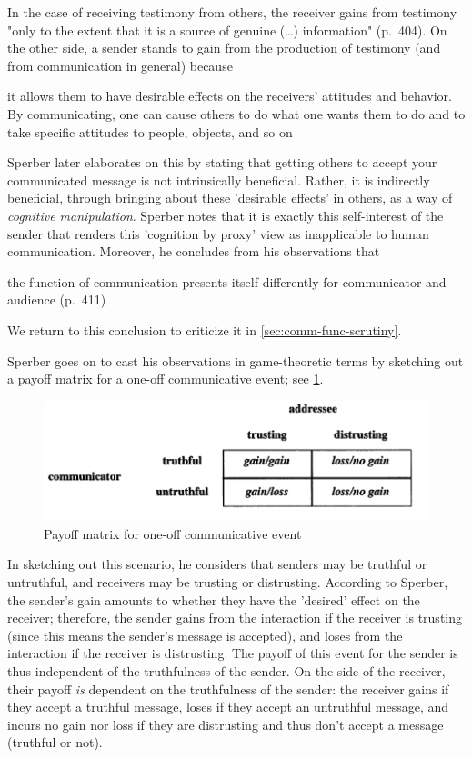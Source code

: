 In the case of receiving testimony from others, the receiver gains from testimony "only to the extent that it is a source of genuine (\ldots) information" (p.~404).
On the other side, a sender stands to gain from the production of testimony (and from communication in general) because
\begin{quoting}
    it allows them to have desirable effects on the receivers' attitudes and behavior. By communicating, one can cause others to do what one wants them to do and to take specific attitudes to people, objects, and so on
    \hfill \citep[p.~404]{Sperber01}
\end{quoting}
Sperber later elaborates on this by stating that getting others to accept your communicated message is not intrinsically beneficial. Rather, it is indirectly beneficial, through bringing about these 'desirable effects' in others, as a way of \emph{cognitive manipulation}.
Sperber notes that it is exactly this self-interest of the sender that renders this 'cognition by proxy' view as inapplicable to human communication.
Moreover, he concludes from his observations that
\begin{quoting}
    the function of communication presents itself differently for communicator and audience
    \hfill (p.~411)
\end{quoting}
We return to this conclusion to criticize it in \cref{sec:comm-func-scrutiny}.

Sperber goes on to cast his observations in game-theoretic terms by sketching out a payoff matrix for a one-off communicative event; see \cref{fig:matrix}.

\begin{figure}[ht]
    \centering
    \includegraphics[width=\textwidth]{chapters/img/matrix-sperber.png}
    \caption{Payoff matrix for one-off communicative event}
    \label{fig:matrix}
\end{figure}

In sketching out this scenario, he considers that senders may be truthful or untruthful, and receivers may be trusting or distrusting. According to Sperber, the sender's gain amounts to whether they have the 'desired' effect on the receiver; therefore, the sender gains from the interaction if the receiver is trusting (since this means the sender's message is accepted), and loses from the interaction if the receiver is distrusting. The payoff of this event for the sender is thus independent of the truthfulness of the sender. On the side of the receiver, their payoff \emph{is} dependent on the truthfulness of the sender: the receiver gains if they accept a truthful message, loses if they accept an untruthful message, and incurs no gain nor loss if they are distrusting and thus don't accept a message (truthful or not).

